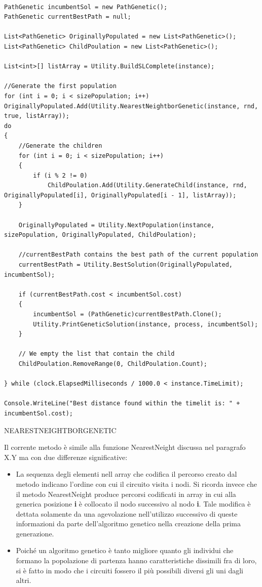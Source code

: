 \documentclass[11pt]{article}
\begin{document}
\begin{lstlisting}

PathGenetic incumbentSol = new PathGenetic();
PathGenetic currentBestPath = null;

List<PathGenetic> OriginallyPopulated = new List<PathGenetic>();
List<PathGenetic> ChildPoulation = new List<PathGenetic>();

List<int>[] listArray = Utility.BuildSLComplete(instance);

//Generate the first population
for (int i = 0; i < sizePopulation; i++)
OriginallyPopulated.Add(Utility.NearestNeightborGenetic(instance, rnd, true, listArray));
do
{
    //Generate the children
    for (int i = 0; i < sizePopulation; i++)
    {
        if (i % 2 != 0)
            ChildPoulation.Add(Utility.GenerateChild(instance, rnd, OriginallyPopulated[i], OriginallyPopulated[i - 1], listArray));
    }

    OriginallyPopulated = Utility.NextPopulation(instance, sizePopulation, OriginallyPopulated, ChildPoulation);

    //currentBestPath contains the best path of the current population
    currentBestPath = Utility.BestSolution(OriginallyPopulated, incumbentSol);

    if (currentBestPath.cost < incumbentSol.cost)
    {
        incumbentSol = (PathGenetic)currentBestPath.Clone();
        Utility.PrintGeneticSolution(instance, process, incumbentSol);
    }

    // We empty the list that contain the child
    ChildPoulation.RemoveRange(0, ChildPoulation.Count);

} while (clock.ElapsedMilliseconds / 1000.0 < instance.TimeLimit);

Console.WriteLine("Best distance found within the timelit is: " + incumbentSol.cost);

\end{lstlisting}


\vspace{2\baselineskip}
NEARESTNEIGHTBORGENETIC
\vspace{2\baselineskip}

Il corrente metodo è simile alla funzione NearestNeight discussa nel paragrafo X.Y ma con due differenze significative:

\begin{itemize}
    \item La sequenza degli elementi nell array che codifica il percorso creato dal metodo indicano l'ordine con cui il circuito visita i nodi. Si ricorda invece che il metodo NearestNeight produce percorsi codificati in array in cui alla generica posizione \textbf{i} è collocato il nodo successivo al nodo \textbf{i}. Tale modifica è dettata solamente da una agevolazione nell'utilizzo successivo di queste informazioni da parte dell'algoritmo genetico nella creazione della prima generazione.
    
    \item Poiché un algoritmo genetico è tanto migliore quanto gli individui che formano la popolazione di partenza hanno caratteristiche dissimili fra di loro, si è fatto in modo che i circuiti fossero il più possibili diversi gli uni dagli altri.
\end{itemize}
\end{document}
